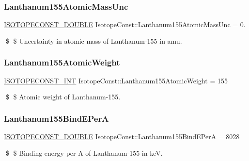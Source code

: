 \subsubsection{\texorpdfstring{Lanthanum155\+Atomic\+Mass\+Unc}{Lanthanum155AtomicMassUnc}}
{\footnotesize\ttfamily \mbox{\hyperlink{group___isotope_const-_macros_ga8f45a7272ce02c0b4c65c44636ed719a}{I\+S\+O\+T\+O\+P\+E\+C\+O\+N\+S\+T\+\_\+\+D\+O\+U\+B\+LE}} Isotope\+Const\+::\+Lanthanum155\+Atomic\+Mass\+Unc = 0.}

\$ \$ Uncertainty in atomic mass of Lanthanum-\/155 in amu. \mbox{\label{group___isotope_const-_lanthanum-_la155_ga5c6d34fc8c26c29430a59129a01f9bdc}} 
\subsubsection{\texorpdfstring{Lanthanum155\+Atomic\+Weight}{Lanthanum155AtomicWeight}}
{\footnotesize\ttfamily \mbox{\hyperlink{group___isotope_const-_macros_ga5f18360b3e99483a35c32d789e62621c}{I\+S\+O\+T\+O\+P\+E\+C\+O\+N\+S\+T\+\_\+\+I\+NT}} Isotope\+Const\+::\+Lanthanum155\+Atomic\+Weight = 155}

\$ \$ Atomic weight of Lanthanum-\/155. \mbox{\label{group___isotope_const-_lanthanum-_la155_ga2f9a540ed9734a123211eb0c2469caf0}} 
\subsubsection{\texorpdfstring{Lanthanum155\+Bind\+E\+PerA}{Lanthanum155BindEPerA}}
{\footnotesize\ttfamily \mbox{\hyperlink{group___isotope_const-_macros_ga8f45a7272ce02c0b4c65c44636ed719a}{I\+S\+O\+T\+O\+P\+E\+C\+O\+N\+S\+T\+\_\+\+D\+O\+U\+B\+LE}} Isotope\+Const\+::\+Lanthanum155\+Bind\+E\+PerA = 8028}

\$ \$ Binding energy per A of Lanthanum-\/155 in keV. \mbox{\label{group___isotope_const-_lanthanum-_la155_ga9c87ac132abc802a6c3a3f31b81b6cc0}} 
